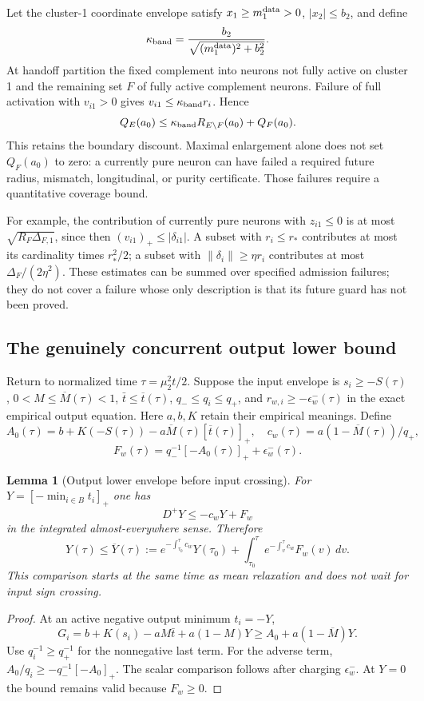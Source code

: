 \documentclass{article} %
\theoremstyle{plain}
\newtheorem{lemma}[theorem]{Lemma}
\theoremstyle{definition}
\theoremstyle{remark}
\begin{document}
Let the cluster-1 coordinate envelope satisfy
$x_1\ge m_1^{\rm data}>0$, $|x_2|\le b_2$, and define
\[\kappa_{\rm band}=\frac{b_2}{\sqrt{(m_1^{\rm data})^2+b_2^2}}.\]
At handoff partition the fixed complement into neurons not fully active
on cluster 1 and the remaining set $F$ of fully active complement neurons.
Failure of full activation with $v_{i1}>0$ gives
$v_{i1}\le\kappa_{\rm band}r_i$. Hence
\begin{equation}\label{sbflux:handoff-weight}
 Q_E(a_0)\le\kappa_{\rm band}R_{E\setminus F}(a_0)
                      +Q_F(a_0).
\end{equation}
This retains the boundary discount. Maximal enlargement alone does not
set $Q_F(a_0)$ to zero: a currently pure neuron can have failed a required
future radius, mismatch, longitudinal, or purity certificate. Those
failures require a quantitative coverage bound.

For example, the contribution of currently pure neurons with $z_{i1}\le0$
is at most $\sqrt{R_F\Delta_{F,1}}$, since then
$(v_{i1})_+\le|\delta_{i1}|$.
A subset with $r_i\le r_*$ contributes at most its cardinality times
$r_*^2/2$; a subset with $\|\delta_i\|\ge\eta r_i$ contributes at most
$\Delta_F/(2\eta^2)$. These estimates can be summed over specified
admission failures; they do not cover a failure whose only description
is that its future guard has not been proved.

\subsection{The genuinely concurrent output lower bound}

Return to normalized time $\tau=\mu_2^2t/2$. Suppose the input envelope is
$s_i\ge-S(\tau)$, $0<M\le\overline M(\tau)<1$,
$\bar t\le\overline t(\tau)$, $q_-\le q_i\le q_+$, and
$r_{w,i}\ge-\epsilon_w^-(\tau)$ in the exact empirical output equation.
Here $a,b,K$ retain their empirical meanings. Define
\[
 A_0(\tau)=b+K(-S(\tau))
            -a\overline M(\tau)[\overline t(\tau)]_+,
 \quad c_w(\tau)=a(1-\overline M(\tau))/q_+,
\]
\[
 F_w(\tau)=q_-^{-1}[-A_0(\tau)]_++\epsilon_w^-(\tau).
\]

\begin{lemma}[Output lower envelope before input crossing]
\label{sbflux:pre-cross-output}
For $Y=[-\min_{i\in B}t_i]_+$ one has
\[
 D^+Y\le-c_wY+F_w
\]
in the integrated almost-everywhere sense. Therefore
\begin{equation}\label{sbflux:Y-envelope}
 Y(\tau)\le \overline Y(\tau):=
 e^{-\int_{\tau_0}^\tau c_w}Y(\tau_0)
 +\int_{\tau_0}^\tau e^{-\int_v^\tau c_w}F_w(v)\,dv.
\end{equation}
This comparison starts at the same time as mean relaxation and does not
wait for input sign crossing.
\end{lemma}
\begin{proof}
At an active negative output minimum $t_i=-Y$,
\[
 G_i=b+K(s_i)-aM\bar t+a(1-M)Y
       \ge A_0+a(1-\overline M)Y.
\]
Use $q_i^{-1}\ge q_+^{-1}$ for the nonnegative last term.
For the adverse term, $A_0/q_i\ge-q_-^{-1}[-A_0]_+$.
The scalar comparison follows after charging $\epsilon_w^-$.
At $Y=0$ the bound remains valid because $F_w\ge0$.
\end{proof}
\end{document}
